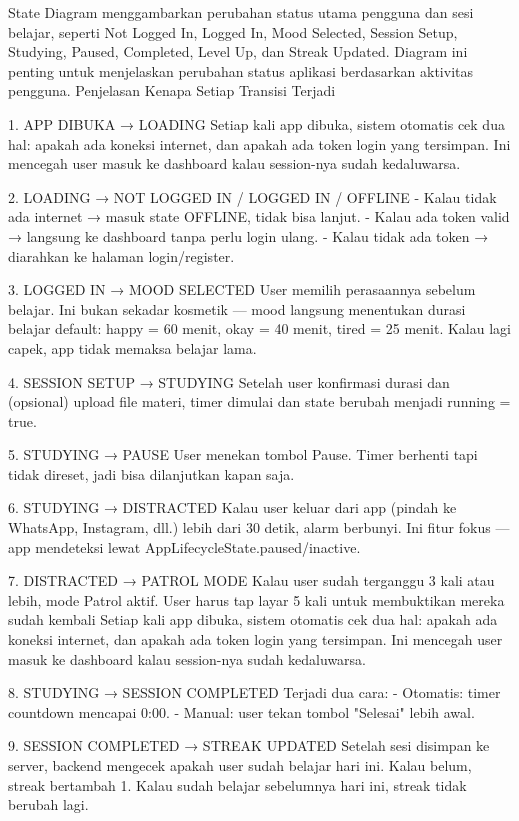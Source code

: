 \documentclass[11pt]{article}
\begin{document}
State Diagram menggambarkan perubahan status utama pengguna dan sesi belajar, seperti Not Logged In, Logged In, Mood Selected, Session Setup, Studying, Paused, Completed, Level Up, dan Streak Updated. Diagram ini penting untuk menjelaskan perubahan status aplikasi berdasarkan aktivitas pengguna. Penjelasan Kenapa Setiap Transisi Terjadi
  
  1. APP DIBUKA → LOADING
  Setiap kali app dibuka, sistem otomatis cek dua hal: apakah ada koneksi internet, dan apakah ada token login yang tersimpan. Ini
  mencegah user masuk ke dashboard kalau session-nya sudah kedaluwarsa.

  2. LOADING → NOT LOGGED IN / LOGGED IN / OFFLINE
  - Kalau tidak ada internet → masuk state OFFLINE, tidak bisa lanjut.
  - Kalau ada token valid → langsung ke dashboard tanpa perlu login ulang.
  - Kalau tidak ada token → diarahkan ke halaman login/register.

  3. LOGGED IN → MOOD SELECTED
  User memilih perasaannya sebelum belajar. Ini bukan sekadar kosmetik — mood langsung menentukan durasi belajar default: happy = 60
  menit, okay = 40 menit, tired = 25 menit. Kalau lagi capek, app tidak memaksa belajar lama.

  4. SESSION SETUP → STUDYING
  Setelah user konfirmasi durasi dan (opsional) upload file materi, timer dimulai dan state berubah menjadi running = true.

  5. STUDYING → PAUSE
  User menekan tombol Pause. Timer berhenti tapi tidak direset, jadi bisa dilanjutkan kapan saja.

  6. STUDYING → DISTRACTED
  Kalau user keluar dari app (pindah ke WhatsApp, Instagram, dll.) lebih dari 30 detik, alarm berbunyi. Ini fitur fokus — app
  mendeteksi lewat AppLifecycleState.paused/inactive.

  7. DISTRACTED → PATROL MODE
  Kalau user sudah terganggu 3 kali atau lebih, mode Patrol aktif. User harus tap layar 5 kali untuk membuktikan mereka sudah kembali
  Setiap kali app dibuka, sistem otomatis cek dua hal: apakah ada koneksi internet, dan apakah ada token login yang tersimpan. Ini
  mencegah user masuk ke dashboard kalau session-nya sudah kedaluwarsa.

  8. STUDYING → SESSION COMPLETED
  Terjadi dua cara:
  - Otomatis: timer countdown mencapai 0:00.
  - Manual: user tekan tombol "Selesai" lebih awal.

  9. SESSION COMPLETED → STREAK UPDATED
  Setelah sesi disimpan ke server, backend mengecek apakah user sudah belajar hari ini. Kalau belum, streak bertambah 1. Kalau sudah
  belajar sebelumnya hari ini, streak tidak berubah lagi.
\end{document}

